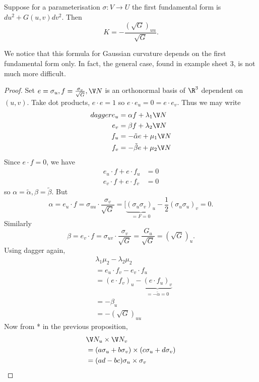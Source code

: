 \documentclass[a4paper]{article}
\theoremstyle{definition}
\begin{document}
\begin{theorem}
  Suppose for a parameterisation \(\sigma: V \to U\) the first fundamental form is \(du^2 + G(u, v) dv^2\). Then
  \[
    K = -\frac{(\sqrt G)_{uu}}{\sqrt G}.
  \]
\end{theorem}
We notice that this formula for Gaussian curvature depends on the first fundamental form only. In fact, the general case, found in example sheet 3, is not much more difficult.

\begin{proof}
  Set \(e = \sigma_u, f = \frac{\sigma_v}{\sqrt G}, \V N\) is an orthonormal basis of \(\R^3\) dependent on \((u, v)\). Take dot products, \(e \cdot e = 1\) so \(e \cdot e_u = 0 = e \cdot e_v\). Thus we may write
  \begin{align*}
    dagger
    e_u &= \alpha f + \lambda_1 \V N \\
    e_v &= \beta f + \lambda_2 \V N \\
    f_u &= - \tilde \alpha e + \mu_1 \V N \\
    f_v &= - \tilde \beta e + \mu_2 \V N
  \end{align*}
  Since \(e \cdot f = 0\), we have
  \begin{align*}
    e_u \cdot f + e \cdot f_u &= 0 \\
    e_v \cdot f + e \cdot f_v &= 0
  \end{align*}
  so \(\alpha = \tilde \alpha, \beta = \tilde \beta\). But
  \[
    \alpha = e_u \cdot f = \sigma_{uu} \cdot \frac{\sigma_v}{\sqrt G} = [\underbrace{(\sigma_u \sigma_v)_u}_{= F = 0} - \frac{1}{2}(\sigma_u\sigma_u)_v = 0.
  \]
  Similarly
  \[
    \beta = e_v \cdot f = \sigma_{uv} \cdot \frac{\sigma_v}{\sqrt G} = \frac{G_u}{\sqrt G} = (\sqrt G)_u.
  \]
  Using dagger again,
  \begin{align*}
    & \lambda_1 \mu_2 - \lambda_2 \mu_2 \\
    &= e_u \cdot f_v - e_v \cdot f_u \\
    &= (e \cdot f_v)_u - \underbrace{(e \cdot f_u)_v}_{= -\tilde \alpha = 0} \\
    &= -\beta_u \\
    &= - (\sqrt G)_{uu}
  \end{align*}
  Now from * in the previous proposition,
  \begin{align*}
    & \V N_u \times \V N_v \\
    &= (a \sigma_u + b \sigma_v) \times (c \sigma_u + d \sigma_v) \\
    &= (ad - bc) \sigma_u \times \sigma_v \\

\end{align*}
\end{proof}
\end{document}
